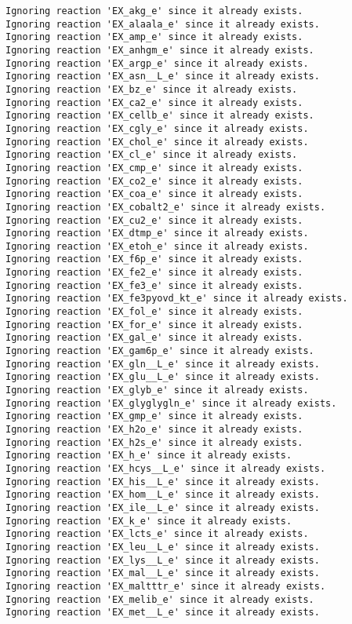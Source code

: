 \documentclass[
  letterpaper,
  DIV=11,
  numbers=noendperiod]{scrartcl}
\begin{document}
\begin{verbatim}
Ignoring reaction 'EX_akg_e' since it already exists.
Ignoring reaction 'EX_alaala_e' since it already exists.
Ignoring reaction 'EX_amp_e' since it already exists.
Ignoring reaction 'EX_anhgm_e' since it already exists.
Ignoring reaction 'EX_argp_e' since it already exists.
Ignoring reaction 'EX_asn__L_e' since it already exists.
Ignoring reaction 'EX_bz_e' since it already exists.
Ignoring reaction 'EX_ca2_e' since it already exists.
Ignoring reaction 'EX_cellb_e' since it already exists.
Ignoring reaction 'EX_cgly_e' since it already exists.
Ignoring reaction 'EX_chol_e' since it already exists.
Ignoring reaction 'EX_cl_e' since it already exists.
Ignoring reaction 'EX_cmp_e' since it already exists.
Ignoring reaction 'EX_co2_e' since it already exists.
Ignoring reaction 'EX_coa_e' since it already exists.
Ignoring reaction 'EX_cobalt2_e' since it already exists.
Ignoring reaction 'EX_cu2_e' since it already exists.
Ignoring reaction 'EX_dtmp_e' since it already exists.
Ignoring reaction 'EX_etoh_e' since it already exists.
Ignoring reaction 'EX_f6p_e' since it already exists.
Ignoring reaction 'EX_fe2_e' since it already exists.
Ignoring reaction 'EX_fe3_e' since it already exists.
Ignoring reaction 'EX_fe3pyovd_kt_e' since it already exists.
Ignoring reaction 'EX_fol_e' since it already exists.
Ignoring reaction 'EX_for_e' since it already exists.
Ignoring reaction 'EX_gal_e' since it already exists.
Ignoring reaction 'EX_gam6p_e' since it already exists.
Ignoring reaction 'EX_gln__L_e' since it already exists.
Ignoring reaction 'EX_glu__L_e' since it already exists.
Ignoring reaction 'EX_glyb_e' since it already exists.
Ignoring reaction 'EX_glyglygln_e' since it already exists.
Ignoring reaction 'EX_gmp_e' since it already exists.
Ignoring reaction 'EX_h2o_e' since it already exists.
Ignoring reaction 'EX_h2s_e' since it already exists.
Ignoring reaction 'EX_h_e' since it already exists.
Ignoring reaction 'EX_hcys__L_e' since it already exists.
Ignoring reaction 'EX_his__L_e' since it already exists.
Ignoring reaction 'EX_hom__L_e' since it already exists.
Ignoring reaction 'EX_ile__L_e' since it already exists.
Ignoring reaction 'EX_k_e' since it already exists.
Ignoring reaction 'EX_lcts_e' since it already exists.
Ignoring reaction 'EX_leu__L_e' since it already exists.
Ignoring reaction 'EX_lys__L_e' since it already exists.
Ignoring reaction 'EX_mal__L_e' since it already exists.
Ignoring reaction 'EX_maltttr_e' since it already exists.
Ignoring reaction 'EX_melib_e' since it already exists.
Ignoring reaction 'EX_met__L_e' since it already exists.

\end{verbatim}
\end{document}
